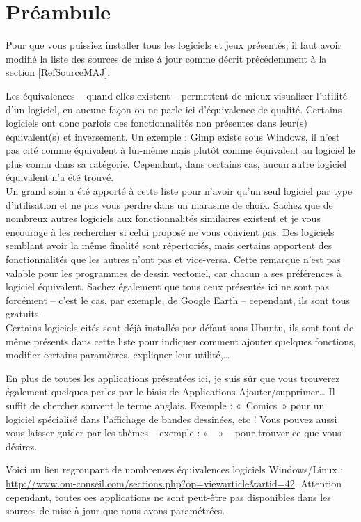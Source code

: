 \section{Préambule}
Pour que vous puissiez installer tous les logiciels et jeux présentés,  il faut avoir modifié la liste des sources de mise à jour comme décrit précédemment à la section \ref{RefSourceMAJ}.\par
Les équivalences -- quand elles existent -- permettent de mieux visualiser l'utilité d'un logiciel, en aucune façon on ne parle ici d'équivalence de qualité. Certains logiciels ont donc parfois des fonctionnalités non présentes dans leur(s) équivalent(s) et inversement. Un exemple : Gimp existe sous Windows, il n'est pas cité comme équivalent à lui-même mais plutôt comme équivalent au logiciel le plus connu dans sa catégorie. Cependant, dans certains cas, aucun autre logiciel équivalent n'a été trouvé.\\
Un grand soin a été apporté à cette liste pour n'avoir qu'un seul logiciel par type d'utilisation et ne pas vous perdre dans un marasme de choix. Sachez que de nombreux autres logiciels aux fonctionnalités similaires existent et je vous encourage à les rechercher si celui proposé ne vous convient pas. Des logiciels semblant avoir la même finalité sont répertoriés, mais certains apportent des fonctionnalités que les autres n'ont pas et vice-versa. Cette remarque n'est pas valable pour les programmes de dessin vectoriel, car chacun a ses préférences à logiciel équivalent. Sachez également que tous ceux présentés ici ne sont pas forcément  -- c'est le cas, par exemple, de Google Earth -- cependant, ils sont tous gratuits.\\
Certains logiciels cités sont déjà installés par défaut sous Ubuntu, ils sont tout de même présents dans cette liste pour indiquer comment ajouter quelques fonctions, modifier certains paramètres, expliquer leur utilité,\ldots{}\par
En plus de toutes les applications présentées ici, je suis sûr que vous trouverez également quelques perles par le biais de Applications \FlecheDroite Ajouter/supprimer\dots{} Il suffit de chercher souvent le terme anglais. Exemple : «~Comics~» pour un logiciel spécialisé dans l'affichage de bandes dessinées, etc ! Vous pouvez aussi vous laisser guider par les thèmes -- exemple : «~~» -- pour trouver ce que vous désirez.\par
\begin{nota}
Voici un lien regroupant de nombreuses équivalences logiciels Windows/Linux : \\\url{http://www.om-conseil.com/sections.php?op=viewarticle&artid=42}. Attention cependant, toutes ces applications ne sont peut-être pas disponibles dans les sources de mise à jour que nous avons paramétrées.
\end{nota}
